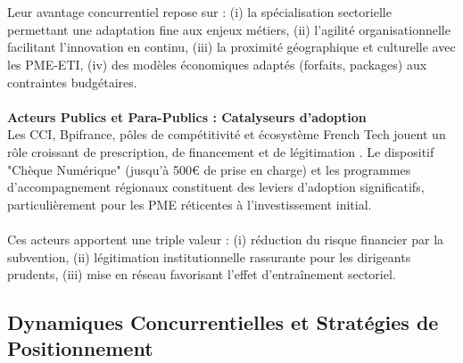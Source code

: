 \\\\
Leur avantage concurrentiel repose sur : (i) la spécialisation sectorielle permettant une adaptation fine aux enjeux métiers, (ii) l'agilité organisationnelle facilitant l'innovation en continu, (iii) la proximité géographique et culturelle avec les PME-ETI, (iv) des modèles économiques adaptés (forfaits, packages) aux contraintes budgétaires.
\\\\
\textbf{Acteurs Publics et Para-Publics : Catalyseurs d'adoption}\\
Les CCI, Bpifrance, pôles de compétitivité et écosystème French Tech jouent un rôle croissant de prescription, de financement et de légitimation \cite{france_strategie2025make}. Le dispositif "Chèque Numérique" (jusqu'à 500€ de prise en charge) et les programmes d'accompagnement régionaux constituent des leviers d'adoption significatifs, particulièrement pour les PME réticentes à l'investissement initial.
\\\\
Ces acteurs apportent une triple valeur : (i) réduction du risque financier par la subvention, (ii) légitimation institutionnelle rassurante pour les dirigeants prudents, (iii) mise en réseau favorisant l'effet d'entraînement sectoriel.

\subsection{Dynamiques Concurrentielles et Stratégies de Positionnement}


